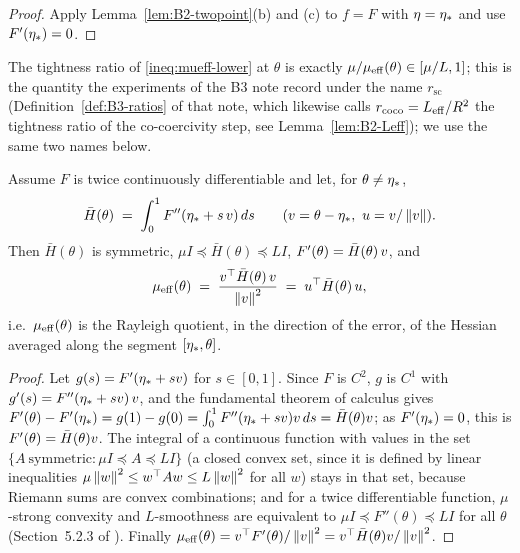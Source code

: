 \begin{proof}
Apply Lemma~\ref{lem:B2-twopoint}(b) and (c) to $f=F$ with $\eta=\eta_\ast$ and use $F'(\eta_\ast)=0$.
\end{proof}

The tightness ratio of \eqref{ineq:mueff-lower} at $\theta$ is exactly $\mu/\mu_{\mathrm{eff}}(\theta)\in[\mu/L,1]$; this
is the quantity the experiments of the B3 note record under the name $r_{\mathrm{sc}}$ (Definition~\ref{def:B3-ratios}
of that note, which likewise calls $r_{\mathrm{coco}}=L_{\mathrm{eff}}/R^2$ the tightness ratio of the co-coercivity step, see
Lemma~\ref{lem:B2-Leff}); we use the same two names below.

\begin{lemma}\label{lem:B2-integral}
Assume $F$ is twice continuously differentiable and let, for $\theta\neq\eta_\ast$,
\[
\bar H(\theta)\;=\;\int_0^1 F''(\etastar+s\,v)\,ds \qquad (v=\theta-\etastar,\ u=v/\norm{v}).
\]
Then $\bar H(\theta)$ is symmetric, $\mu I\preccurlyeq\bar H(\theta)\preccurlyeq L I$, $F'(\theta)=\bar H(\theta)\,v$, and
\begin{equation}\label{eq:B2-rayleigh}
\mu_{\mathrm{eff}}(\theta)\;=\;\frac{v^\top\bar H(\theta)\,v}{\left\|v\right\|^2}\;=\;u^\top\bar H(\theta)\,u ,
\end{equation}
i.e.\ $\mu_{\mathrm{eff}}(\theta)$ is the Rayleigh quotient, in the direction of the error, of the Hessian averaged along the
segment $[\eta_\ast,\theta]$.
\end{lemma}

\begin{proof}
Let $g(s)=F'(\eta_\ast+sv)$ for $s\in[0,1]$. Since $F$ is $C^2$, $g$ is $C^1$ with
$g'(s)=F''(\eta_\ast+sv)\,v$, and the fundamental theorem of calculus gives
$F'(\theta)-F'(\eta_\ast)=g(1)-g(0)=\int_0^1F''(\eta_\ast+sv)v\,ds=\bar H(\theta)v$;
as $F'(\eta_\ast)=0$, this is $F'(\theta)=\bar H(\theta)v$. The integral of a continuous function
with values in the set $\{A\ \text{symmetric}: \mu I\preccurlyeq A\preccurlyeq LI\}$ (a closed convex set,
since it is defined by linear inequalities $\mu\left\|w\right\|^2\le w^\top Aw\le L\left\|w\right\|^2$ for all $w$)
stays in that set, because Riemann sums are convex combinations; and for a twice differentiable
function, $\mu$-strong convexity and $L$-smoothness are equivalent to $\mu I\preccurlyeq F''(\theta)\preccurlyeq LI$
for all $\theta$ (Section~5.2.3 of \cite{bach2024learning}). Finally
$\mu_{\mathrm{eff}}(\theta)=v^\top F'(\theta)/\left\|v\right\|^2=v^\top\bar H(\theta)v/\left\|v\right\|^2$.
\end{proof}

